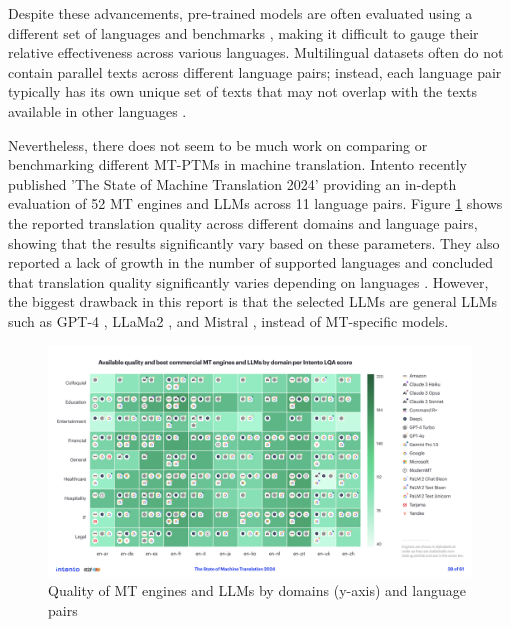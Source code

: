 \documentclass[a4paper, 11pt]{article}
\begin{document}
Despite these advancements, pre-trained models are often evaluated using a different set of languages and benchmarks \cite{liu-2020-mbart,nllb200-2020,fan-2020-m2m100,wei-2023-polylm}, making it difficult to gauge their relative effectiveness across various languages. Multilingual datasets often do not contain parallel texts across different language pairs; instead, each language pair typically has its own unique set of texts that may not overlap with the texts available in other languages \cite{tiedemann-2020-tatoeba-challenge,cettolo-2012-wit3}.

Nevertheless, there does not seem to be much work on comparing or benchmarking different MT-PTMs in machine translation. Intento recently published 'The State of Machine Translation 2024' \cite{intento-2024} providing an in-depth evaluation of 52 MT engines and LLMs across 11 language pairs. Figure \ref{fig:intento_quality} shows the reported translation quality across different domains and language pairs, showing that the results significantly vary based on these parameters. They also reported a lack of growth in the number of supported languages and concluded that translation quality significantly varies depending on languages \cite{intento-2024}. However, the biggest drawback in this report is that the selected LLMs are general LLMs such as GPT-4 \cite{openai-2024-gpt4}, LLaMa2 \cite{touvron-2023-llama2}, and Mistral \cite{jiang-2023-mistral-7b}, instead of MT-specific models.

\begin{figure}[htbp]
    \centering
    \includegraphics[width=1\linewidth]{images/intento_quality.png}
    \caption{Quality of MT engines and LLMs by domains (y-axis) and language pairs \cite{intento-2024}}
    \label{fig:intento_quality}
\end{figure}
\end{document}
